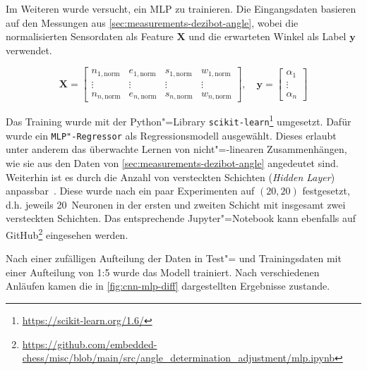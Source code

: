 
Im Weiteren wurde versucht, ein MLP zu trainieren. Die Eingangsdaten basieren auf den Messungen aus \autoref{sec:measurements-dezibot-angle}, wobei die normalisierten Sensordaten als Feature $\mathbf{X}$ und die erwarteten Winkel als Label $\mathbf{y}$ verwendet.

\begin{equation*}
    \mathbf{X} = \begin{bmatrix}
        n_{1,\text{norm}} & e_{1,\text{norm}} & s_{1,\text{norm}} & w_{1,\text{norm}} \\
        \vdots & \vdots & \vdots & \vdots \\
        n_{n,\text{norm}} & e_{n,\text{norm}} & s_{n,\text{norm}} & w_{n,\text{norm}}
    \end{bmatrix},
    \quad \mathbf{y} = \begin{bmatrix}
        \alpha_1 \\ \vdots \\ \alpha_n
    \end{bmatrix}
\end{equation*}

Das Training wurde mit der Python"=Library \texttt{scikit-learn}\footnote{\url{https://scikit-learn.org/1.6/}} umgesetzt. Dafür wurde ein \texttt{MLP"-Regressor} als Regressionsmodell ausgewählt. Dieses erlaubt unter anderem das überwachte Lernen von nicht"=-linearen Zusammenhängen, wie sie aus den Daten von \autoref{sec:measurements-dezibot-angle} angedeutet sind. Weiterhin ist es durch die Anzahl von versteckten Schichten (\emph{Hidden Layer}) anpassbar~\cite{scikit-learndevelopers117NeuralNetwork2025}. Diese wurde nach ein paar Experimenten auf $(20,20)$ festgesetzt, d.h. jeweils 20~Neuronen in der ersten und zweiten Schicht mit insgesamt zwei versteckten Schichten. Das entsprechende Jupyter"=Notebook kann ebenfalls auf GitHub\footnote{\url{https://github.com/embedded-chess/misc/blob/main/src/angle_determination_adjustment/mlp.ipynb}} eingesehen werden.

Nach einer zufälligen Aufteilung der Daten in Test"= und Trainingsdaten mit einer Aufteilung von 1:5 wurde das Modell trainiert. Nach verschiedenen Anläufen kamen die in \autoref{fig:cnn-mlp-diff} dargestellten Ergebnisse zustande.


